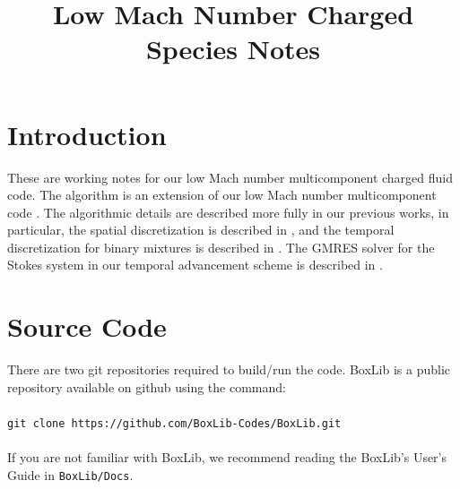 \documentclass[final]{siamltex}
\begin{document}
\title{Low Mach Number Charged Species Notes}

\maketitle

\section{Introduction}
These are working notes for our low Mach number multicomponent charged fluid code.
The algorithm is an extension of our low Mach number multicomponent code
\cite{LowMachMulti}.  The algorithmic details are described more fully in
our previous works, in particular, the spatial discretization is described in
\cite{lowMachMixing}, and the temporal discretization for binary mixtures is
described in \cite{lowMachImplicit}.  The GMRES solver for the Stokes system
in our temporal advancement scheme is described in \cite{StokesPreconditioners}.

\section{Source Code}
There are two git repositories required to build/run the code.  BoxLib is a public
repository available on github using the command:\\ \\
{\tt git clone https://github.com/BoxLib-Codes/BoxLib.git}\\ \\
If you are not familiar with BoxLib, we recommend reading the BoxLib's User's Guide
in {\tt BoxLib/Docs}.\\
\end{document}

